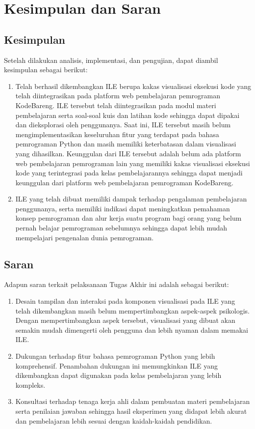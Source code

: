 \chapter{Kesimpulan dan Saran}


\section{Kesimpulan}
Setelah dilakukan analisis, implementasi, dan pengujian, dapat diambil kesimpulan sebagai berikut:
\begin{enumerate}
  \item Telah berhasil dikembangkan ILE berupa kakas visualisasi eksekusi kode yang telah diintegrasikan pada platform web pembelajaran pemrograman KodeBareng. ILE tersebut telah diintegrasikan pada modul materi pembelajaran serta soal-soal kuis dan latihan kode sehingga dapat dipakai dan dieksplorasi oleh penggunanya. Saat ini, ILE tersebut masih belum mengimplementasikan keseluruhan fitur yang terdapat pada bahasa pemrograman Python dan masih memiliki keterbatasan dalam visualisasi yang dihasilkan. Keunggulan dari ILE tersebut adalah belum ada platform web pembelajaran pemrograman lain yang memiliki kakas visualisasi eksekusi kode yang terintegrasi pada kelas pembelajarannya sehingga dapat menjadi keunggulan dari platform web pembelajaran pemrograman KodeBareng.
  \item ILE yang telah dibuat memiliki dampak terhadap pengalaman pembelajaran penggunanya, serta memiliki indikasi dapat meningkatkan pemahaman konsep pemrograman dan alur kerja suatu program bagi orang yang belum pernah belajar pemrograman sebelumnya sehingga dapat lebih mudah mempelajari pengenalan dunia pemrograman.
\end{enumerate}

\section{Saran}
Adapun saran terkait pelaksanaan Tugas Akhir ini adalah sebagai berikut:
\begin{enumerate}
  \item Desain tampilan dan interaksi pada komponen visualisasi pada ILE yang telah dikembangkan masih belum mempertimbangkan aspek-aspek psikologis. Dengan mempertimbangkan aspek tersebut, visualisasi yang dibuat akan semakin mudah dimengerti oleh pengguna dan lebih nyaman dalam memakai ILE.
  \item Dukungan terhadap fitur bahasa pemrograman Python yang lebih komprehensif. Penambahan dukungan ini memungkinkan ILE yang dikembangkan dapat digunakan pada kelas pembelajaran yang lebih kompleks.
  \item Konsultasi terhadap tenaga kerja ahli dalam pembuatan materi pembelajaran serta penilaian jawaban sehingga hasil eksperimen yang didapat lebih akurat dan pembelajaran lebih sesuai dengan kaidah-kaidah pendidikan.
\end{enumerate}